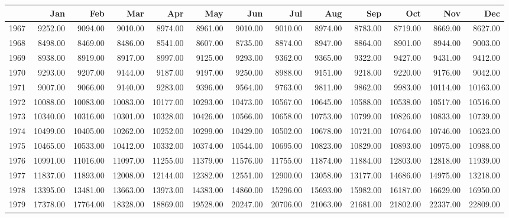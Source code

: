 \begin{longtable}{rrrrrrrrrrrrr}
  \hline
 & Jan & Feb & Mar & Apr & May & Jun & Jul & Aug & Sep & Oct & Nov & Dec \\ 
  \hline
1967 & 9252.00 & 9094.00 & 9010.00 & 8974.00 & 8961.00 & 9010.00 & 9010.00 & 8974.00 & 8783.00 & 8719.00 & 8669.00 & 8627.00 \\ 
  1968 & 8498.00 & 8469.00 & 8486.00 & 8541.00 & 8607.00 & 8735.00 & 8874.00 & 8947.00 & 8864.00 & 8901.00 & 8944.00 & 9003.00 \\ 
  1969 & 8938.00 & 8919.00 & 8917.00 & 8997.00 & 9125.00 & 9293.00 & 9362.00 & 9365.00 & 9322.00 & 9427.00 & 9431.00 & 9412.00 \\ 
  1970 & 9293.00 & 9207.00 & 9144.00 & 9187.00 & 9197.00 & 9250.00 & 8988.00 & 9151.00 & 9218.00 & 9220.00 & 9176.00 & 9042.00 \\ 
  1971 & 9007.00 & 9066.00 & 9140.00 & 9283.00 & 9396.00 & 9564.00 & 9763.00 & 9811.00 & 9862.00 & 9983.00 & 10114.00 & 10163.00 \\ 
  1972 & 10088.00 & 10083.00 & 10083.00 & 10177.00 & 10293.00 & 10473.00 & 10567.00 & 10645.00 & 10588.00 & 10538.00 & 10517.00 & 10516.00 \\ 
  1973 & 10340.00 & 10316.00 & 10301.00 & 10328.00 & 10426.00 & 10566.00 & 10658.00 & 10753.00 & 10799.00 & 10826.00 & 10833.00 & 10739.00 \\ 
  1974 & 10499.00 & 10405.00 & 10262.00 & 10252.00 & 10299.00 & 10429.00 & 10502.00 & 10678.00 & 10721.00 & 10764.00 & 10746.00 & 10623.00 \\ 
  1975 & 10465.00 & 10533.00 & 10412.00 & 10332.00 & 10374.00 & 10544.00 & 10695.00 & 10823.00 & 10829.00 & 10893.00 & 10975.00 & 10988.00 \\ 
  1976 & 10991.00 & 11016.00 & 11097.00 & 11255.00 & 11379.00 & 11576.00 & 11755.00 & 11874.00 & 11884.00 & 12803.00 & 12818.00 & 11939.00 \\ 
  1977 & 11837.00 & 11893.00 & 12008.00 & 12144.00 & 12382.00 & 12551.00 & 12900.00 & 13058.00 & 13177.00 & 14686.00 & 14975.00 & 13218.00 \\ 
  1978 & 13395.00 & 13481.00 & 13663.00 & 13973.00 & 14383.00 & 14860.00 & 15296.00 & 15693.00 & 15982.00 & 16187.00 & 16629.00 & 16950.00 \\ 
  1979 & 17378.00 & 17764.00 & 18328.00 & 18869.00 & 19528.00 & 20247.00 & 20706.00 & 21063.00 & 21681.00 & 21802.00 & 22337.00 & 22809.00 \\ 

\end{longtable}
